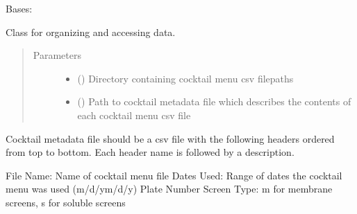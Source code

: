 \documentclass[letterpaper,10pt,english]{sphinxmanual}
\begin{document}
\begin{fulllineitems}
\label{\detokenize{polo.utils:polo.utils.io_utils.BarTender}}
Bases: 

Class for organizing and accessing 
{\hyperref[\detokenize{polo.utils:polo.utils.io_utils.Menu}]{}} data.
\begin{quote}\begin{description}
\item[{Parameters}] \leavevmode\begin{itemize}
\item {} 
 () \textendash{} Directory containing cocktail menu csv filepaths

\item {} 
 () \textendash{} Path to cocktail metadata file which describes the contents of
each cocktail menu csv file

\end{itemize}

\end{description}\end{quote}

Cocktail metadata file should be a csv file with the following
headers ordered from top to bottom. Each header name is followed by a
description.

\begin{sphinxVerbatim}[commandchars=\\\{\}]
File Name: Name of cocktail menu file
Dates Used: Range of dates the cocktail menu was used (m/d/y\PYGZhy{}m/d/y)
Plate Number
Screen Type: \PYGZsq{}m\PYGZsq{} for membrane screens, \PYGZsq{}s\PYGZsq{} for soluble screens
\end{sphinxVerbatim}


\end{fulllineitems}
\end{document}
